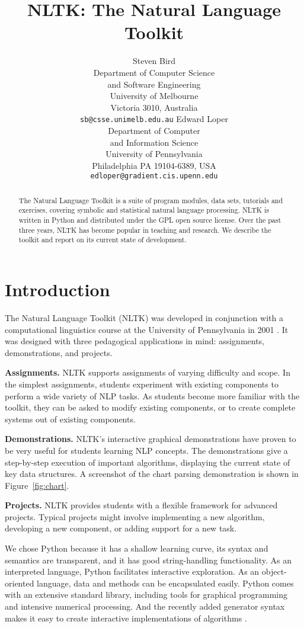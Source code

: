 \documentclass[11pt]{article}
\title{NLTK: The Natural Language Toolkit}
\author{
  Steven Bird \\
  Department of Computer Science \\
  \indent and Software Engineering \\
  University of Melbourne \\
  Victoria 3010, Australia \\  
  {\tt sb@csse.unimelb.edu.au}
\And
  Edward Loper\\
  Department of Computer \\
  \indent and Information Science \\
  University of Pennsylvania\\
  Philadelphia PA 19104-6389, USA\\
  {\tt edloper@gradient.cis.upenn.edu}
}
\date{}
\begin{document}
\maketitle

\begin{abstract}
  The Natural Language Toolkit is a suite of program modules, data
  sets, tutorials and exercises, covering symbolic and statistical
  natural language processing.  NLTK is written in Python and
  distributed under the GPL open source license.  Over the past three
  years, NLTK has become popular in teaching and research.  We
  describe the toolkit and report on its current state of development.
\end{abstract}

\section{Introduction}

The Natural Language Toolkit (NLTK) was developed in conjunction with
a computational linguistics course at the University of Pennsylvania
in 2001 \cite{LoperBird02}.  It was designed with three pedagogical
applications in mind: assignments, demonstrations, and projects.

\textbf{Assignments.}
NLTK supports assignments of varying difficulty
and scope.  In the simplest assignments, students experiment with
existing components to perform a wide variety of NLP tasks.  As students
become more familiar with the toolkit, they can be asked to modify
existing components, or to create complete systems out of existing
components.

\textbf{Demonstrations.}
NLTK's interactive graphical demonstrations have proven to be very
useful for students learning NLP concepts.
The demonstrations give a step-by-step execution of important
algorithms, displaying the current state of key data structures.
A screenshot of the chart parsing demonstration is shown in Figure~\ref{fig:chart}.

\textbf{Projects.}  NLTK provides students with a flexible framework
for advanced projects.  Typical projects might involve implementing a
new algorithm, developing a new component, or adding support for a new
task.

We chose Python because it has a shallow learning curve, its syntax
and semantics are transparent, and it has good string-handling
functionality.  As an interpreted language, Python facilitates
interactive exploration.  As an object-oriented language, data and
methods can be encapsulated easily.  Python comes with an extensive
standard library, including tools for graphical programming and
intensive numerical processing.  And the recently added generator
syntax makes it easy to create interactive implementations of
algorithms \cite{Loper04,Rossum03intro,Rossum03ref}.
\end{document}
